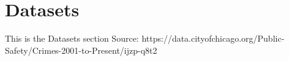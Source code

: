 \section{Datasets}\label{Section label}
This is the Datasets section
\newline
Source: https://data.cityofchicago.org/Public-Safety/Crimes-2001-to-Present/ijzp-q8t2



